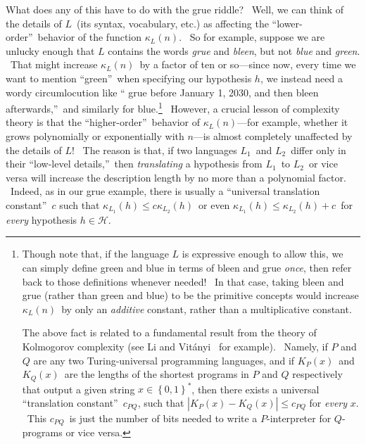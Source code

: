 \documentclass[12pt,onecolumn]{article}%
\begin{document}
What does any of this have to do with the grue riddle? \ Well, we can think of
the details of $L$\ (its syntax, vocabulary, etc.) as affecting the
\textquotedblleft lower-order\textquotedblright\ behavior of the function
$\kappa_{L}\left(  n\right)  $. \ So for example, suppose we are unlucky
enough that $L$ contains the words \textit{grue} and \textit{bleen}, but not
\textit{blue} and \textit{green}. \ That might increase $\kappa_{L}\left(
n\right)  $\ by a factor of ten or so---since now, every time we want to
mention \textquotedblleft green\textquotedblright\ when specifying our
hypothesis $h$, we instead need a wordy circumlocution like \textquotedblleft
grue before January 1, 2030, and then bleen afterwards,\textquotedblright\ and
similarly for blue.\footnote{Though note that, if the language \thinspace$L$
is expressive enough to allow this, we can simply define green and blue in
terms of bleen and grue \textit{once}, then refer back to those definitions
whenever needed! \ In that case, taking bleen and grue (rather than green and
blue) to be the primitive concepts would increase $\kappa_{L}\left(  n\right)
$\ by only an \textit{additive} constant, rather than a multiplicative
constant.
\par
The above fact is related to a fundamental result from the theory of
Kolmogorov complexity (see Li and Vit\'{a}nyi \cite{livitanyi}\ for example).
\ Namely, if $P$ and $Q$ are any two Turing-universal programming languages,
and if $K_{P}\left(  x\right)  $\ and $K_{Q}\left(  x\right)  $\ are the
lengths of the shortest programs in $P$ and $Q$ respectively that output a
given string $x\in\left\{  0,1\right\}  ^{\ast}$, then there exists a
universal \textquotedblleft translation constant\textquotedblright\ $c_{PQ}$,
such that $\left\vert K_{P}\left(  x\right)  -K_{Q}\left(  x\right)
\right\vert \leq c_{PQ}$ for \textit{every} $x$. \ This $c_{PQ}$\ is just the
number of bits needed to write a $P$-interpreter for $Q$-programs or vice
versa.} \ However, a crucial lesson of complexity theory is that the
\textquotedblleft higher-order\textquotedblright\ behavior of $\kappa
_{L}\left(  n\right)  $---for example, whether it grows polynomially or
exponentially with $n$---is almost completely unaffected by the details of
$L$! \ The reason is that, if two languages $L_{1}$\ and $L_{2}$\ differ only
in their \textquotedblleft low-level details,\textquotedblright\ then
\textit{translating} a hypothesis from $L_{1}$\ to $L_{2}$\ or vice versa will
increase the description length by no more than a polynomial factor. \ Indeed,
as in our grue example, there is usually a \textquotedblleft universal
translation constant\textquotedblright\ $c$ such that $\kappa_{L_{1}}\left(
h\right)  \leq c\kappa_{L_{2}}\left(  h\right)  $\ or even $\kappa_{L_{1}%
}\left(  h\right)  \leq\kappa_{L_{2}}\left(  h\right)  +c$\ for \textit{every}
hypothesis $h\in\mathcal{H}$.
\end{document}
